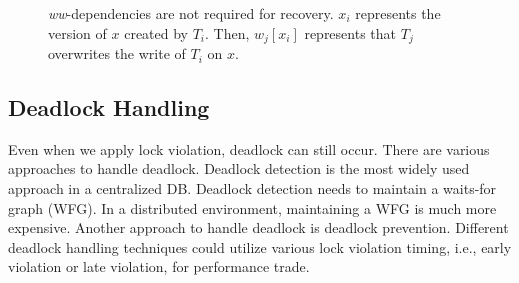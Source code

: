 \documentclass[conference]{IEEEtran}
\begin{document}
\begin{figure}[tbp]
  \caption{\emph{ww}-dependencies are not required for recovery.
  ${x_i}$ represents the version of $x$ created by ${T_i}$.
 Then, $w_j[x_i]$ represents that ${T_j}$ overwrites the write of ${T_i}$ on $x$.
}
\label{fig:versions_example}
\end{figure}


\subsection {Deadlock Handling}
\label{sec:deadlock_handling}
Even when we apply lock violation, deadlock can still occur.
There are various approaches to handle deadlock.
Deadlock detection is the most widely used approach in a centralized DB.
Deadlock detection needs to maintain a waits-for graph (WFG).
In a distributed environment, maintaining a WFG is much more expensive.
Another approach to handle deadlock is deadlock prevention.
Different deadlock handling techniques 
could utilize various lock violation timing, i.e., early violation or late violation, for performance trade.
\end{document}
